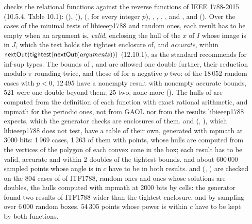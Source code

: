 \documentclass[12pt,a4paper,twoside,openright]{book}
\begin{document}
\medskip
{} checks the relational functions against the reverse functions
of IEEE 1788-2015 (10.5.4, Table 10.1):  (),
 (),  (,
for every integer $p$),\newinvfive{} , ,
, , and , \code{\%} and
\code{\%=} (). Over the cases of the minimal tests of
libieeep1788 and random ones, each result has to be empty when an argument
is, \emph{valid}, enclosing the hull of the $x$ of $I$ whose image is in
$J$, which the test holds the tightest enclosure of, and \emph{accurate},
within $\textsf{nextOut}(\textsf{tightest}(\textsf{nextOut}(\mathit{arguments})))$
(12.10.1), as the standard recommends for inf-sup types. The bounds of
,  and  are allowed one
double further, their reduction modulo $\pi$ rounding twice, and those of
 for a negative $p$ two: of the 18\,052 random cases
with $p<0$, 12\,495 have a nonempty result with nonempty accurate bounds,
521 were one double beyond them, 25 two, none more
().
The hulls of  are computed from the definition of
each function with exact rational arithmetic, and mpmath for the periodic
ones, not from GAOL nor from the results libieeep1788 expects, which the
generator checks are enclosures of them.  and
 (, ),\newinvfive{}
which libieeep1788 does not test, have a table of their own, generated with
mpmath at 3000 bits: 1\,969 cases, 1\,263 of them with points, whose hulls
are computed from the vertices of the polygon of each convex cone in the
box; each result has to be valid, accurate and within 2 doubles of the
tightest bounds, and about 600\,000 sampled points whose angle is in $c$
have to be in both results.  and 
(, )\newinvfive{} are checked on the 804 cases
of  of ITF1788, random ones and ones whose solutions are
doubles, the hulls computed with mpmath at 2000 bits by cells: the generator
found two results of ITF1788 wider than the tightest enclosure, and by
sampling over 6\,000 random boxes, 54\,305 points whose power is within $c$
have to be kept by both functions.
\end{document}
